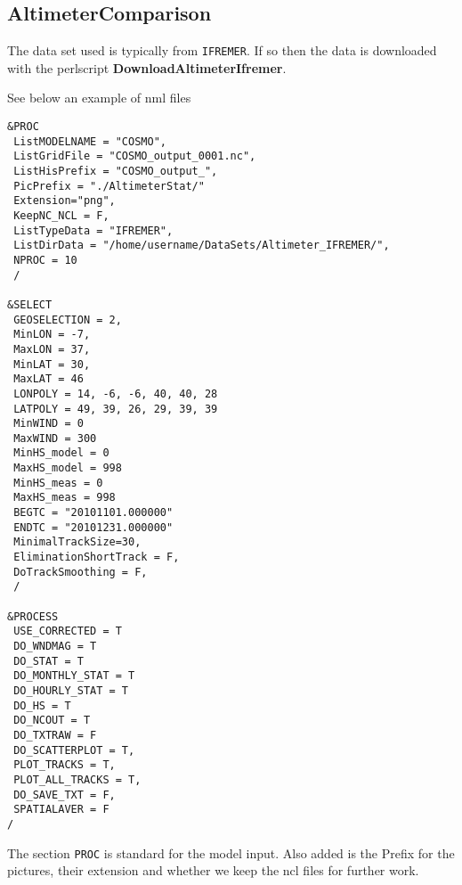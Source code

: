\documentclass[12pt]{amsart}
\begin{document}
\subsection{AltimeterComparison}

The data set used is typically from {\tt IFREMER}.
If so then the data is downloaded with the perlscript {\bf DownloadAltimeterIfremer}.

See below an example of nml files
\begin{verbatim}
&PROC
 ListMODELNAME = "COSMO",
 ListGridFile = "COSMO_output_0001.nc",
 ListHisPrefix = "COSMO_output_",
 PicPrefix = "./AltimeterStat/"
 Extension="png",
 KeepNC_NCL = F,
 ListTypeData = "IFREMER", 
 ListDirData = "/home/username/DataSets/Altimeter_IFREMER/", 
 NPROC = 10
 /

&SELECT
 GEOSELECTION = 2,
 MinLON = -7, 
 MaxLON = 37, 
 MinLAT = 30, 
 MaxLAT = 46
 LONPOLY = 14, -6, -6, 40, 40, 28
 LATPOLY = 49, 39, 26, 29, 39, 39
 MinWIND = 0
 MaxWIND = 300
 MinHS_model = 0 
 MaxHS_model = 998
 MinHS_meas = 0 
 MaxHS_meas = 998
 BEGTC = "20101101.000000"
 ENDTC = "20101231.000000"
 MinimalTrackSize=30,
 EliminationShortTrack = F,
 DoTrackSmoothing = F,
 /

&PROCESS
 USE_CORRECTED = T
 DO_WNDMAG = T
 DO_STAT = T
 DO_MONTHLY_STAT = T
 DO_HOURLY_STAT = T
 DO_HS = T
 DO_NCOUT = T
 DO_TXTRAW = F
 DO_SCATTERPLOT = T,
 PLOT_TRACKS = T,
 PLOT_ALL_TRACKS = T,
 DO_SAVE_TXT = F,
 SPATIALAVER = F
/
\end{verbatim}
The section {\tt PROC} is standard for the model input. Also added is the Prefix for the pictures, their extension and whether we keep the ncl files for further work.
\end{document}
